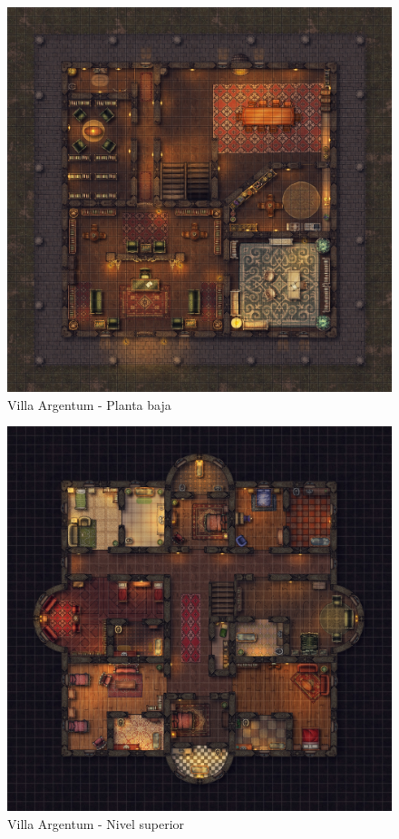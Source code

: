 \documentclass[10pt,twoside,twocolumn,openany]{dndbook}
\begin{document}
\begin{figure}[hb!]
  \centering
  \includegraphics[width=\textwidth]{maps/villa-argentum-pb.jpg}
  \caption{Villa Argentum - Planta baja}
  \label{fig:vapbfull}
\end{figure}

\begin{figure}[hb!]
  \centering
  \includegraphics[width=\textwidth]{maps/villa-argentum-l1.jpg}
  \caption{Villa Argentum - Nivel superior}
  \label{fig:val1full}
\end{figure}
\end{document}
